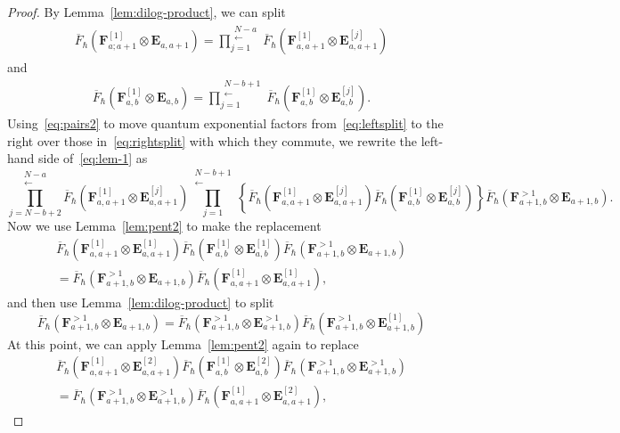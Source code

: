 \documentclass[11pt, reqno]{amsart}
\theoremstyle{definition}
\numberwithin{equation}{section}
\def\beq{\begin{equation}}
\def\eeq{\end{equation}}
\newcommand{\hc}[1]{\left\{#1\right\}}                                                  %
\def\stgE{\mathbf{E}}
\def\stgF{\mathbf{F}}
\begin{document}
\begin{proof}
By Lemma~\ref{lem:dilog-product}, we can split
\begin{align}
\label{eq:leftsplit}
\overline F_\hbar(\stgF^{[1]}_{a;a+1} \otimes \stgE_{a,a+1}) = \prod_{j=1}^{\substack{N-a \\[-2pt] \longleftarrow}} \overline F_\hbar(\stgF^{[1]}_{a,a+1} \otimes \stgE^{[j]}_{a,a+1})
\end{align}
and 
\begin{align}
\label{eq:rightsplit}
\overline{F}_\hbar( \stgF^{[1]}_{a,b}\otimes\stgE_{a,b})= \prod_{j=1}^{\substack{N-b+1 \\[-2pt] \longleftarrow}}\overline{F}_\hbar( \stgF^{[1]}_{a,b}\otimes\stgE^{[j]}_{a,b}).
\end{align}
Using~\eqref{eq:pairs2} to move quantum exponential factors from~\eqref{eq:leftsplit} to the right over those in~\eqref{eq:rightsplit} with which they commute, we rewrite the left-hand side of~\eqref{eq:lem-1} as
\beq
\label{eq:lem-1-2}
\prod_{j=N-b+2}^{\substack{N-a \\[-2pt] \longleftarrow}} \overline F_\hbar(\stgF^{[1]}_{a,a+1} \otimes \stgE^{[j]}_{a,a+1}) \!\!\!\prod\limits_{j=1}^{\substack{N-b+1 \\[-2pt] \longleftarrow}}\hc{\overline F_\hbar(\stgF^{[1]}_{a,a+1} \otimes \stgE^{[j]}_{a,a+1})\overline{F}_\hbar( \stgF^{[1]}_{a,b}\otimes\stgE^{[j]}_{a,b})}\overline{F}_\hbar( \stgF^{>1}_{a+1,b}\otimes\stgE_{a+1,b}).
\eeq
Now we use Lemma~\ref{lem:pent2} to make the replacement
\begin{multline*}
\overline F_\hbar(\stgF^{[1]}_{a,a+1} \otimes \stgE^{[1]}_{a,a+1})\overline{F}_\hbar( \stgF^{[1]}_{a,b}\otimes\stgE^{[1]}_{a,b})\overline{F}_\hbar( \stgF^{>1}_{a+1,b}\otimes\stgE_{a+1,b})\\=\overline{F}_\hbar( \stgF^{>1}_{a+1,b}\otimes\stgE_{a+1,b})\overline F_\hbar(\stgF^{[1]}_{a,a+1} \otimes \stgE^{[1]}_{a,a+1}),
\end{multline*}
and then use Lemma~\ref{lem:dilog-product} to split
$$
\overline{F}_\hbar( \stgF^{>1}_{a+1,b}\otimes\stgE_{a+1,b}) = \overline{F}_\hbar( \stgF^{>1}_{a+1,b}\otimes\stgE^{>1}_{a+1,b})\overline{F}_\hbar( \stgF^{>1}_{a+1,b}\otimes\stgE^{[1]}_{a+1,b})
$$
At this point, we can apply Lemma~\ref{lem:pent2} again to replace
\begin{multline*}
\overline F_\hbar(\stgF^{[1]}_{a,a+1} \otimes \stgE^{[2]}_{a,a+1})\overline{F}_\hbar( \stgF^{[1]}_{a,b}\otimes\stgE^{[2]}_{a,b})\overline{F}_\hbar( \stgF^{>1}_{a+1,b}\otimes\stgE^{>1}_{a+1,b})\\=\overline{F}_\hbar( \stgF^{>1}_{a+1,b}\otimes\stgE^{>1}_{a+1,b})\overline F_\hbar(\stgF^{[1]}_{a,a+1} \otimes \stgE^{[2]}_{a,a+1}),

\end{multline*}
\end{proof}
\end{document}
